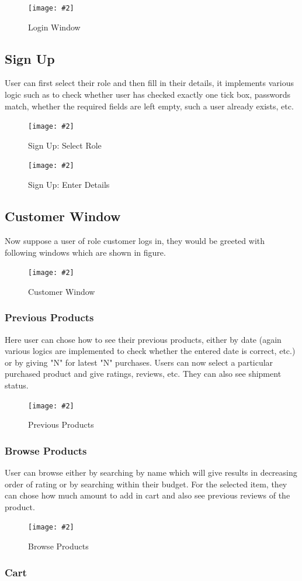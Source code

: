 \documentclass[a4paper,12pt]{article}
\newcommand{\iph}[2]{
    \texttt{[image: \#2]}
}
\newcommand{\dph}[3]{
\begin{figure}[H]
  \centering
  \iph{#1}{#2}
  \caption{#3}
\end{figure}
}
\begin{document}
\dph{0.78}{log}{Login Window}

\subsection{Sign Up}

User can first select their role and then fill in their details, it implements various logic such as to check whether user has checked exactly one tick box, passwords match, whether the required fields are left empty, such a user already exists, etc.

\dph{0.78}{sign}{Sign Up: Select Role}

\dph{0.78}{sign2}{Sign Up: Enter Details}

\subsection{Customer Window}

Now suppose a user of role customer logs in, they would be greeted with following windows which are shown in figure.

\dph{0.66}{customer}{Customer Window}


\subsubsection{Previous Products}

Here user can chose how to see their previous products, either by date (again various logics are implemented to check whether the entered date is correct, etc.) or by giving "N" for latest "N" purchases. Users can now select a particular purchased product and give ratings, reviews, etc. They can also see shipment status.

\dph{0.99}{previousprod}{Previous Products}

\subsubsection{Browse Products}

User can browse either by searching by name which will give results in decreasing order of rating or by searching within their budget. For the selected item, they can chose how much amount to add in cart and also see previous reviews of the product.

\dph{0.99}{browseprod}{Browse Products}

\subsubsection{Cart}
\end{document}
